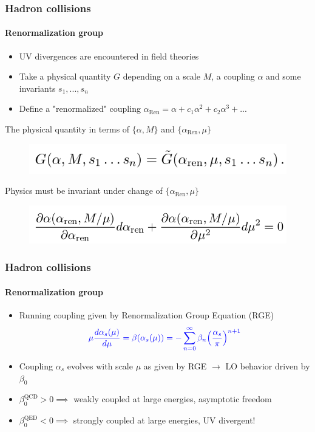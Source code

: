 \documentclass[aspectratio=43]{beamer}
\begin{document}
\begin{frame}

	\frametitle{Hadron collisions}
	\framesubtitle{Renormalization group}
	
	\begin{itemize}
		\item UV divergences are encountered in field theories
		\item Take a physical quantity $G$ depending on a scale $M$, a coupling $\alpha$ and some invariants $s_{1}, ..., s_{n}$	
		\item Define a "renormalized" coupling $\alpha_{\textrm{Ren}} = \alpha + c_{1}\alpha^{2} + c_{2}\alpha^{3} + ...$
	\end{itemize}
 
	The physical quantity in terms of $\{\alpha, M\}$ and $\{\alpha_{\textrm{Ren}}, \mu\}$ 
	\begin{figure}
		\includegraphics[width = 7 cm]{plots/eq_RGE.png}
	\end{figure}

	{\color{blue}Physics must be invariant under change of $\{\alpha_{\textrm{Ren}}, \mu\}$}
	\begin{figure}
		\includegraphics[width = 7 cm]{plots/eq_RGE_2.png}
	\end{figure}

\end{frame}

\begin{frame}

	\frametitle{Hadron collisions}
	\framesubtitle{Renormalization group}
	
	\begin{itemize}
		\item Running coupling given by Renormalization Group Equation (RGE)
		\begin{equation}
		{\color{blue}\mu\frac{d\alpha_{s}(\mu)}{d\mu} = \beta(\alpha_{s}(\mu)) = -\sum_{n = 0}^{\infty} \beta_{n} \Big( \frac{\alpha_{s}}{\pi} \Big)^{n + 1}} \nonumber
		\end{equation}
		\item Coupling {\color{blue}$\alpha_{s}$} evolves with scale {\color{blue}$\mu$} as given by RGE $\rightarrow$ LO behavior driven by $\beta_{0}$
		\item $\beta_{0}^{\textrm{QCD}} > 0 \implies$ weakly coupled at large energies, asymptotic freedom
		\item $\beta_{0}^{\textrm{QED}} < 0 \implies$ strongly coupled at large energies, UV divergent!
		
	\end{itemize}

\end{frame}
\end{document}
